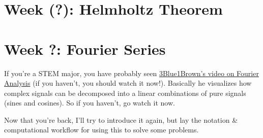 \documentclass[12pt,fleqn]{article}
\numberwithin{equation}{section} %
\newcounter{problem}
\begin{document}
\newpage
\section{Week (?): Helmholtz Theorem}

\newpage
\section{Week ?: Fourier Series}
If you're a STEM major, you have probably seen \href{https://www.youtube.com/watch?v=spUNpyF58BY}
{3Blue1Brown's video on Fourier Analysis} (if you haven't, you should watch it now!). Basically he visualizes how complex signals can be decomposed into a linear combinations of pure signals (sines and cosines). So if you haven't, go watch it now.

Now that you're back, I'll try to introduce it again, but lay the notation \& computational workflow for using this to solve some problems.
\end{document}

